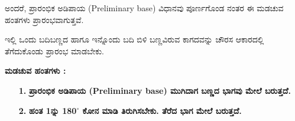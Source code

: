 \begin{enumerate}
\begin{figure}[H]
\end{figure}

\vspace{-.2cm}

ಅಂದರೆ, ಪ್ರಾರಂಭಿಕ ಅಡಿಪಾಯ (Preliminary base) ವಿಧಾನವು ಪೂರ್ಣಗೊಂಡ ನಂತರ ಈ ಮಡಚುವ ಹಂತಗಳು ಪ್ರಾರಂಭವಾಗುತ್ತವೆ.

ಇಲ್ಲಿ ಒಂದು ಬದಿಬಣ್ಣದ ಹಾಗೂ ಇನ್ನೊಂದು ಬದಿ ಬಿಳಿ ಬಣ್ಣವಿರುವ ಕಾಗದವನ್ನು ಚೌರಸ ಆಕಾರದಲ್ಲಿ ತೆಗೆದುಕೊಂಡು ಪ್ರಾರಂಭ ಮಾಡಬೇಕು.

\medskip
\noindent
\textbf{ಮಡಚುವ ಹಂತಗಳು :}
\begin{itemize}
\item[{\bf 1.}] \textbf{ಪ್ರಾರಂಭಿಕ ಅಡಿಪಾಯ (Preliminary base) ಮುಗಿದಾಗ ಬಣ್ಣದ ಭಾಗವು ಮೇಲೆ ಬರುತ್ತದೆ.}

\item[{\bf 2.}] \textbf{ಹಂತ 1ನ್ನು 180$^{\circ}$ ಕೋನ ಮಾಡಿ ತಿರುಗಿಸಬೇಕು. ತೆರೆದ ಭಾಗ ಮೇಲೆ ಬರುತ್ತದೆ.}
\begin{figure}[H]
\end{figure}


\end{itemize}
\end{enumerate}

